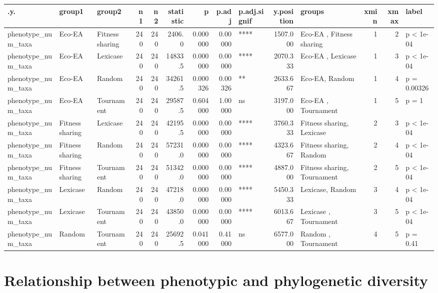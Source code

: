 \documentclass[]{book}
\begin{document}
\begin{table}
\centering
\begin{tabular}[t]{l|l|l|r|r|r|r|r|l|r|l|r|r|l}
\hline
.y. & group1 & group2 & n1 & n2 & statistic & p & p.adj & p.adj.signif & y.position & groups & xmin & xmax & label\\
\hline
phenotype\_num\_taxa & Eco-EA & Fitness sharing & 240 & 240 & 2406.0 & 0.000000 & 0.00000 & **** & 1507.000 & Eco-EA         , Fitness sharing & 1 & 2 & p < 1e-04\\
\hline
phenotype\_num\_taxa & Eco-EA & Lexicase & 240 & 240 & 14833.5 & 0.000000 & 0.00000 & **** & 2070.333 & Eco-EA  , Lexicase & 1 & 3 & p < 1e-04\\
\hline
phenotype\_num\_taxa & Eco-EA & Random & 240 & 240 & 34261.5 & 0.000326 & 0.00326 & ** & 2633.667 & Eco-EA, Random & 1 & 4 & p = 0.00326\\
\hline
phenotype\_num\_taxa & Eco-EA & Tournament & 240 & 240 & 29587.5 & 0.604000 & 1.00000 & ns & 3197.000 & Eco-EA    , Tournament & 1 & 5 & p = 1\\
\hline
phenotype\_num\_taxa & Fitness sharing & Lexicase & 240 & 240 & 42195.5 & 0.000000 & 0.00000 & **** & 3760.333 & Fitness sharing, Lexicase & 2 & 3 & p < 1e-04\\
\hline
phenotype\_num\_taxa & Fitness sharing & Random & 240 & 240 & 57231.0 & 0.000000 & 0.00000 & **** & 4323.667 & Fitness sharing, Random & 2 & 4 & p < 1e-04\\
\hline
phenotype\_num\_taxa & Fitness sharing & Tournament & 240 & 240 & 51342.0 & 0.000000 & 0.00000 & **** & 4887.000 & Fitness sharing, Tournament & 2 & 5 & p < 1e-04\\
\hline
phenotype\_num\_taxa & Lexicase & Random & 240 & 240 & 47218.0 & 0.000000 & 0.00000 & **** & 5450.333 & Lexicase, Random & 3 & 4 & p < 1e-04\\
\hline
phenotype\_num\_taxa & Lexicase & Tournament & 240 & 240 & 43850.0 & 0.000000 & 0.00000 & **** & 6013.667 & Lexicase  , Tournament & 3 & 5 & p < 1e-04\\
\hline
phenotype\_num\_taxa & Random & Tournament & 240 & 240 & 25692.5 & 0.041000 & 0.41000 & ns & 6577.000 & Random    , Tournament & 4 & 5 & p = 0.41\\
\hline
\end{tabular}
\end{table}

\hypertarget{relationship-between-phenotypic-and-phylogenetic-diversity-1}{%
\section{Relationship between phenotypic and phylogenetic diversity}\label{relationship-between-phenotypic-and-phylogenetic-diversity-1}}
\end{document}
